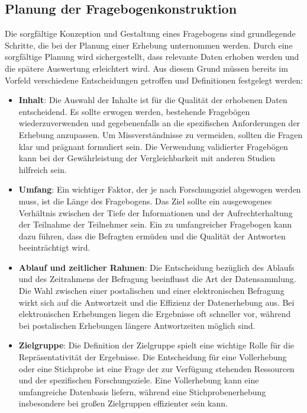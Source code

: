 \subsection{Planung der Fragebogenkonstruktion}
Die sorgfältige Konzeption und Gestaltung eines Fragebogens sind grundlegende Schritte, die bei der Planung einer Erhebung unternommen werden.
Durch eine sorgfältige Planung wird sichergestellt, dass relevante Daten erhoben werden und die spätere Auswertung erleichtert wird.
Aus diesem Grund müssen bereits im Vorfeld verschiedene Entscheidungen getroffen und Definitionen festgelegt werden:
\begin{itemize}
    \item \textbf{Inhalt}: Die Auswahl der Inhalte ist für die Qualität der erhobenen Daten entscheidend. Es sollte erwogen werden, bestehende
    Fragebögen wiederzuverwenden und gegebenenfalls an die spezifischen Anforderungen der Erhebung anzupassen. Um Missverständnisse
    zu vermeiden, sollten die Fragen klar und prägnant formuliert sein. Die Verwendung validierter Fragebögen kann bei der
    Gewährleistung der Vergleichbarkeit mit anderen Studien hilfreich sein.

    \item \textbf{Umfang}: Ein wichtiger Faktor, der je nach Forschungsziel abgewogen werden muss, ist die Länge des Fragebogens. Das Ziel sollte
    ein ausgewogenes Verhältnis zwischen der Tiefe der Informationen und der Aufrechterhaltung der Teilnahme der Teilnehmer
    sein. Ein zu umfangreicher Fragebogen kann dazu führen, dass die Befragten ermüden und die Qualität der Antworten
    beeinträchtigt wird.

    \item \textbf{Ablauf und zeitlicher Rahmen}: Die Entscheidung bezüglich des Ablaufs und des Zeitrahmens der Befragung beeinflusst die Art der Datensammlung. Die
    Wahl zwischen einer postalischen und einer elektronischen Befragung wirkt sich auf die Antwortzeit und die Effizienz
    der Datenerhebung aus. Bei elektronischen Erhebungen liegen die Ergebnisse oft schneller vor, während bei postalischen
    Erhebungen längere Antwortzeiten möglich sind.

    \item \textbf{Zielgruppe}: Die Definition der Zielgruppe spielt eine wichtige Rolle für die Repräsentativität der Ergebnisse. Die Entscheidung
    für eine Vollerhebung oder eine Stichprobe ist eine Frage der zur Verfügung stehenden Ressourcen und der spezifischen
    Forschungsziele. Eine Vollerhebung kann eine umfangreiche Datenbasis liefern, während eine Stichprobenerhebung
    insbesondere bei großen Zielgruppen effizienter sein kann.


\end{itemize}
